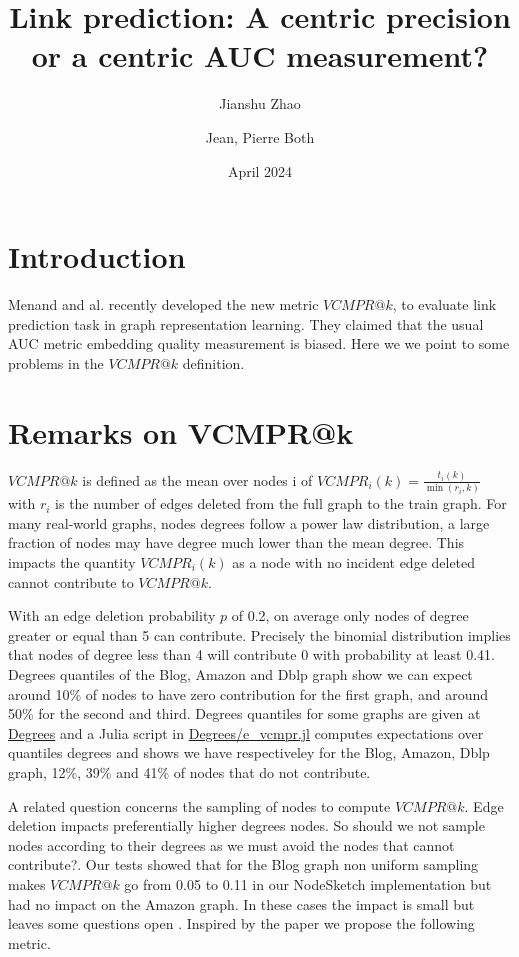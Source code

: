 \documentclass{article}
\title{Link prediction: A centric precision or a centric AUC measurement?}
\author[1]{Jianshu Zhao}
\author[2,*]{Jean, Pierre Both}
\affil[1]{Center for Bioinformatics and Computational Genomics, Georgia Institute of Technology, Atlanta, Georgia, USA}
\affil[2]{Université Paris-Saclay, CEA, List, Palaiseau, France. (Retired)}
\affil[*]{Corresponding author : jeanpierre.both@gmail.com}
\date{April 2024}
\begin{document}
\maketitle

\section{Introduction}

Menand and al. \cite{Menand2024link} recently developed the new metric $VCMPR@k$, to evaluate link prediction task in graph representation learning.
They claimed that the usual AUC metric embedding quality measurement is biased.
Here we we point to some problems in the  $VCMPR@k$ definition.


\section{Remarks on VCMPR@k}
$VCMPR@k$ is defined as the mean over nodes i of  $ VCMPR_{i}(k)= \frac{t_{i}(k)}{\min(r_{i},k)}$ with $ r_{i} $ is the number of edges deleted from the full graph to the train graph.
For many real-world graphs, nodes degrees follow a power law distribution, a large fraction of nodes may have degree much lower than the mean degree.
This impacts the quantity $ VCMPR_{i}(k)$ as a node with no incident edge deleted cannot contribute to $VCMPR@k$.

With an edge deletion probability $p$ of 0.2, on average only nodes of degree greater or equal than 5 can contribute.
Precisely the binomial distribution implies that nodes of degree less than 4 will contribute 0 with probability at least 0.41.
Degrees quantiles of the Blog, Amazon and Dblp graph show we can expect around 10\% of nodes to have zero contribution for the first graph,
and around 50\% for the second and third.
Degrees quantiles for some graphs are given at \href{https://github.com/jean-pierreBoth/linkauc/tree/master/Degrees}{\color{blue}Degrees}
and a Julia script in \href{https://github.com/jean-pierreBoth/linkauc/tree/master/Degrees}{\color{blue}Degrees/e\_vcmpr.jl}
computes expectations over quantiles degrees and shows we have respectiveley for the Blog, Amazon, Dblp graph, 12\%, 39\% and 41\% of nodes that do not contribute.

A related question concerns the sampling of nodes to compute $VCMPR@k$. Edge deletion impacts preferentially higher degrees nodes.
So should we not sample nodes according to their degrees as we must avoid the nodes that cannot contribute?. Our tests showed that for the Blog graph non uniform sampling makes
$VCMPR@k$ go from 0.05 to 0.11 in our NodeSketch \citep{Yang2019nodesketch} implementation but had no impact on the Amazon graph.
In these cases the impact is small but leaves some questions open .
Inspired by the paper we propose the following metric.
\end{document}
